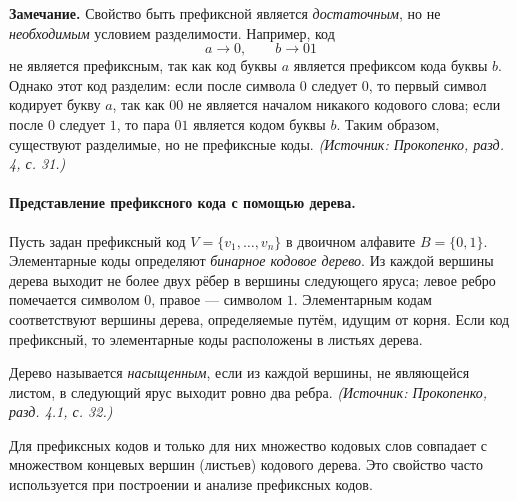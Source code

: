 \documentclass[a4paper,12pt]{article}
\begin{document}
\textbf{Замечание.} Свойство быть префиксной является \emph{достаточным}, но не \emph{необходимым} условием разделимости. Например, код
\[
a\to 0,\qquad b\to 01
\]
не является префиксным, так как код буквы \(a\) является префиксом кода буквы \(b\). Однако этот код разделим: если после символа \(0\) следует \(0\), то первый символ кодирует букву \(a\), так как \(00\) не является началом никакого кодового слова; если после \(0\) следует \(1\), то пара \(01\) является кодом буквы \(b\). Таким образом, существуют разделимые, но не префиксные коды.
\textit{(Источник: Прокопенко, разд. 4, с. 31.)}

\paragraph{Представление префиксного кода с помощью дерева.}
Пусть задан префиксный код \(V=\{v_1,\dots,v_n\}\) в двоичном алфавите \(B=\{0,1\}\). Элементарные коды определяют \emph{бинарное кодовое дерево}. Из каждой вершины дерева выходит не более двух рёбер в вершины следующего яруса; левое ребро помечается символом \(0\), правое — символом \(1\). Элементарным кодам соответствуют вершины дерева, определяемые путём, идущим от корня. Если код префиксный, то элементарные коды расположены в листьях дерева.

Дерево называется \emph{насыщенным}, если из каждой вершины, не являющейся листом, в следующий ярус выходит ровно два ребра.
\textit{(Источник: Прокопенко, разд. 4.1, с. 32.)}

Для префиксных кодов и только для них множество кодовых слов совпадает с множеством концевых вершин (листьев) кодового дерева. Это свойство часто используется при построении и анализе префиксных кодов.
\end{document}
